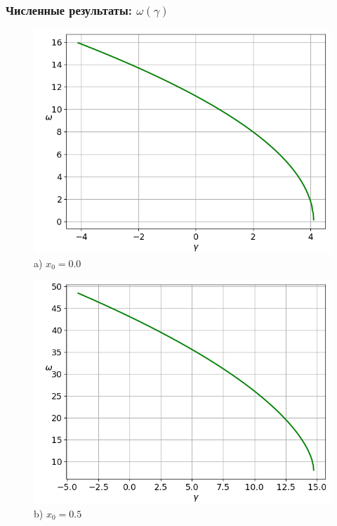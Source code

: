 \documentclass[fullscreen=true, unicode, bookmarks=false]{beamer}
\begin{document}
\begin{frame}
\frametitle{ Численные результаты: $ \omega(\gamma) $ }

\begin{figure} 
\begin{minipage}[h]{0.49\linewidth}
\begin{center}
\includegraphics[scale=0.35]{omegas_x0=0,0.png} \\ {\scriptsize a) $ x_0 = 0.0 $}
\end{center}
\end{minipage} 
\hfill
\begin{minipage}[h]{0.49\linewidth}
\begin{center}
\includegraphics[scale=0.35]{omegas_x0=0,5.png}  \\ {\scriptsize b) $ x_0 = 0.5 $}
\end{center}
\end{minipage} 
\end{figure}

\end{frame}
\end{document}
